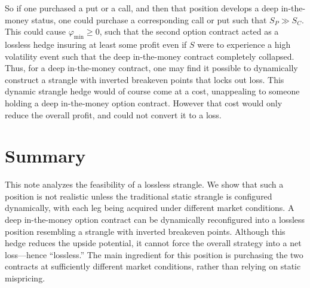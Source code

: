 \documentclass[aps,reprint]{revtex4-2}
\begin{document}
So if one purchased a put or a call, and then that position develops a deep in-the-money status, one could purchase a corresponding call or put such that $S_P \gg S_C$.  This could cause $\varphi_{\min} \ge 0$, such that the second option contract acted as a lossless hedge insuring at least some profit even if $S$ were to experience a high volatility event such that the deep in-the-money contract completely collapsed.
Thus, for a deep in-the-money contract, one may find it possible to dynamically construct a strangle with inverted breakeven points that locks out loss.  This dynamic strangle hedge would of course come at a cost, unappealing to someone holding a deep in-the-money option contract. However that cost would only reduce the overall profit, and could not convert it to a loss.

\section{Summary}

This note analyzes the feasibility of a lossless strangle. We show that such a position is not realistic unless the traditional static strangle is configured dynamically, with each leg being acquired under different market conditions.  A deep in-the-money option contract can be dynamically reconfigured into a lossless position resembling a strangle with inverted breakeven points.  Although this hedge reduces the upside potential, it cannot force the overall strategy into a net loss—hence “lossless.”  The main ingredient for this position is purchasing the two contracts at sufficiently different market conditions, rather than relying on static mispricing.
\end{document}

